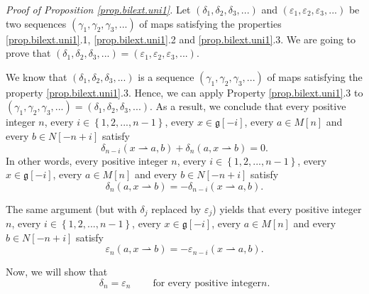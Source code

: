 \documentclass[etingof-lie.tex]{subfiles}
\begin{document}
\begin{noncompile}
\begin{verlong}
\textit{Proof of Proposition \ref{prop.bilext.uni1}.} Let $\left(  \delta
_{1},\delta_{2},\delta_{3},...\right)  $ and $\left(  \varepsilon
_{1},\varepsilon_{2},\varepsilon_{3},...\right)  $ be two sequences $\left(
\gamma_{1},\gamma_{2},\gamma_{3},...\right)  $ of maps satisfying the
properties \ref{prop.bilext.uni1}.1, \ref{prop.bilext.uni1}.2 and
\ref{prop.bilext.uni1}.3. We are going to prove that $\left(  \delta
_{1},\delta_{2},\delta_{3},...\right)  =\left(  \varepsilon_{1},\varepsilon
_{2},\varepsilon_{3},...\right)  $.

We know that $\left(  \delta_{1},\delta_{2},\delta_{3},...\right)  $ is a
sequence $\left(  \gamma_{1},\gamma_{2},\gamma_{3},...\right)  $ of maps
satisfying the property \ref{prop.bilext.uni1}.3. Hence, we can apply Property
\ref{prop.bilext.uni1}.3 to $\left(  \gamma_{1},\gamma_{2},\gamma
_{3},...\right)  =\left(  \delta_{1},\delta_{2},\delta_{3},...\right)  $. As a
result, we conclude that every positive integer $n$, every $i\in\left\{
1,2,...,n-1\right\}  $, every $x\in\mathfrak{g}\left[  -i\right]  $, every
$a\in M\left[  n\right]  $ and every $b\in N\left[  -n+i\right]  $ satisfy%
\[
\delta_{n-i}\left(  x\rightharpoonup a,b\right)  +\delta_{n}\left(
a,x\rightharpoonup b\right)  =0.
\]
In other words, every positive integer $n$, every $i\in\left\{
1,2,...,n-1\right\}  $, every $x\in\mathfrak{g}\left[  -i\right]  $, every
$a\in M\left[  n\right]  $ and every $b\in N\left[  -n+i\right]  $ satisfy%
\begin{equation}
\delta_{n}\left(  a,x\rightharpoonup b\right)  =-\delta_{n-i}\left(
x\rightharpoonup a,b\right)  . \label{prop.bilext.uni1.prop3d}%
\end{equation}


The same argument (but with $\delta_{j}$ replaced by $\varepsilon_{j}$) yields
that every positive integer $n$, every $i\in\left\{  1,2,...,n-1\right\}  $,
every $x\in\mathfrak{g}\left[  -i\right]  $, every $a\in M\left[  n\right]  $
and every $b\in N\left[  -n+i\right]  $ satisfy%
\begin{equation}
\varepsilon_{n}\left(  a,x\rightharpoonup b\right)  =-\varepsilon_{n-i}\left(
x\rightharpoonup a,b\right)  . \label{prop.bilext.uni1.prop3e}%
\end{equation}


Now, we will show that
\begin{equation}
\delta_{n}=\varepsilon_{n}\ \ \ \ \ \ \ \ \ \ \text{for every positive integer
}n\text{.} \label{pf.bilext.uni1.claim}%
\end{equation}



\end{verlong}
\end{noncompile}
\end{document}
